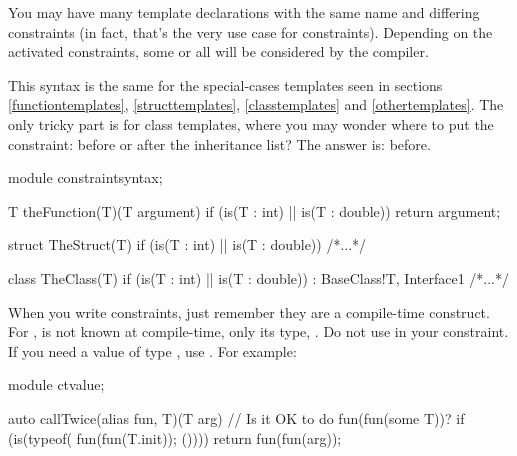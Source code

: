 You may have many template declarations with the same name and differing constraints (in fact, that's the very use case for constraints). Depending on the activated constraints, some or all will be considered by the compiler.


This syntax is the same for the special-cases templates seen in sections \ref{functiontemplates}, \ref{structtemplates}, \ref{classtemplates} and \ref{othertemplates}. The only tricky part is for class templates, where you may wonder where to put the constraint: before or after the inheritance list? The answer is: before.

\begin{dcode}
module constraintsyntax;

T theFunction(T)(T argument)
    if (is(T : int) || is(T : double)) 
{ return argument; }

struct TheStruct(T) 
    if (is(T : int) || is(T : double)) 
{ /*...*/ }

class TheClass(T) 
    if (is(T : int) || is(T : double)) 
    : BaseClass!T, Interface1 
{ /*...*/ }
\end{dcode}

When you write constraints, just remember they are a compile-time construct. For ,  is not known at compile-time, only its type, . Do not use  in your constraint. If you need a value of type , use . For example:

\begin{dcode}
module ctvalue;

auto callTwice(alias fun, T)(T arg)
    // Is it OK to do fun(fun(some T))?
    if (is(typeof({ 
                      fun(fun(T.init)); 
                  }()))) 
{
    return fun(fun(arg));
}
\end{dcode}


